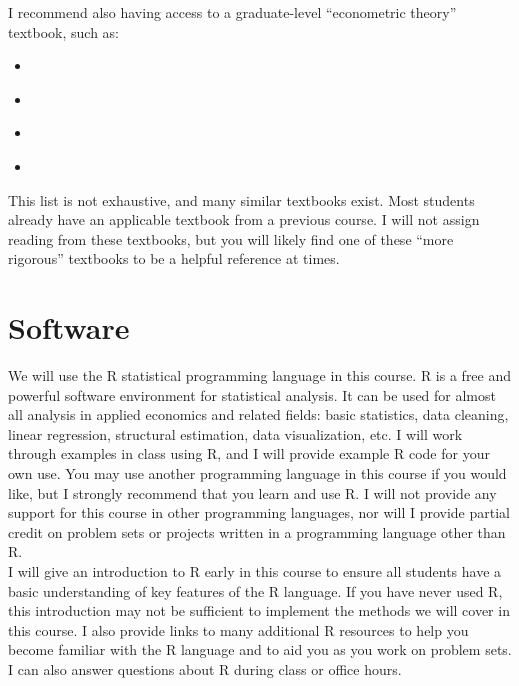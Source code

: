 \documentclass[11pt,letterpaper]{article}
\begin{document}
\noindent I recommend also having access to a graduate-level ``econometric theory'' textbook, such as:
\begin{itemize}
	\item[] \begin{refsection} \nocite{cameronMicroeconometricsMethodsApplications2005} \printbibliography[heading=none] \end{refsection}
  \item[] \begin{refsection} \nocite{greeneEconometricAnalysis2018} \printbibliography[heading=none] \end{refsection}
  \item[] \begin{refsection} \nocite{hayashiEconometrics2000} \printbibliography[heading=none] \end{refsection}
	\item[] \begin{refsection} \nocite{wooldridgeEconomtericAnalysisCross2010} \printbibliography[heading=none] \end{refsection}
\end{itemize}
This list is not exhaustive, and many similar textbooks exist. Most students already have an applicable textbook from a previous course. I will not assign reading from these textbooks, but you will likely find one of these ``more rigorous'' textbooks to be a helpful reference at times.

\section*{Software}

We will use the R statistical programming language in this course. R is a free and powerful software environment for statistical analysis. It can be used for almost all analysis in applied economics and related fields: basic statistics, data cleaning, linear regression, structural estimation, data visualization, etc. I will work through examples in class using R, and I will provide example R code for your own use. You may use another programming language in this course if you would like, but I strongly recommend that you learn and use R. I will not provide any support for this course in other programming languages, nor will I provide partial credit on problem sets or projects written in a programming language other than R. \\

\noindent I will give an introduction to R early in this course to ensure all students have a basic understanding of key features of the R language. If you have never used R, this introduction may not be sufficient to implement the methods we will cover in this course. I also provide links to many additional R resources to help you become familiar with the R language and to aid you as you work on problem sets. I can also answer questions about R during class or office hours.
\end{document}
